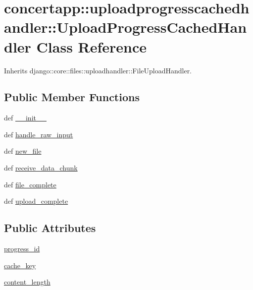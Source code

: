 \hypertarget{classconcertapp_1_1uploadprogresscachedhandler_1_1_upload_progress_cached_handler}{
\section{concertapp::uploadprogresscachedhandler::UploadProgressCachedHandler Class Reference}
\label{classconcertapp_1_1uploadprogresscachedhandler_1_1_upload_progress_cached_handler}
}


Inherits django::core::files::uploadhandler::FileUploadHandler.

\subsection*{Public Member Functions}
\begin{DoxyCompactItemize}
\item 
def \hyperlink{classconcertapp_1_1uploadprogresscachedhandler_1_1_upload_progress_cached_handler_aef2d4559cd94107f73445fa0addcc2ff}{\_\-\_\-init\_\-\_\-}
\item 
def \hyperlink{classconcertapp_1_1uploadprogresscachedhandler_1_1_upload_progress_cached_handler_a9fccf26819ca56c5a1da3d59e439c117}{handle\_\-raw\_\-input}
\item 
def \hyperlink{classconcertapp_1_1uploadprogresscachedhandler_1_1_upload_progress_cached_handler_a677fda07bfc856cb9d0a5423b0f242d1}{new\_\-file}
\item 
def \hyperlink{classconcertapp_1_1uploadprogresscachedhandler_1_1_upload_progress_cached_handler_a7d0b974220ad4b84ff31a4d49155ca66}{receive\_\-data\_\-chunk}
\item 
def \hyperlink{classconcertapp_1_1uploadprogresscachedhandler_1_1_upload_progress_cached_handler_a9b0e364f7645274d6457e03ca3490d96}{file\_\-complete}
\item 
def \hyperlink{classconcertapp_1_1uploadprogresscachedhandler_1_1_upload_progress_cached_handler_a57c1f5603337f3d88ba41b55b9790a88}{upload\_\-complete}
\end{DoxyCompactItemize}
\subsection*{Public Attributes}
\begin{DoxyCompactItemize}
\item 
\hyperlink{classconcertapp_1_1uploadprogresscachedhandler_1_1_upload_progress_cached_handler_ad70a21a38ac236c3046b8bf7c220564f}{progress\_\-id}
\item 
\hyperlink{classconcertapp_1_1uploadprogresscachedhandler_1_1_upload_progress_cached_handler_a30164153cc16e9fe99b8b9492e5b88e5}{cache\_\-key}
\item 
\hyperlink{classconcertapp_1_1uploadprogresscachedhandler_1_1_upload_progress_cached_handler_ad8b731f5311dfdb314762e9485da6e17}{content\_\-length}
\end{DoxyCompactItemize}


